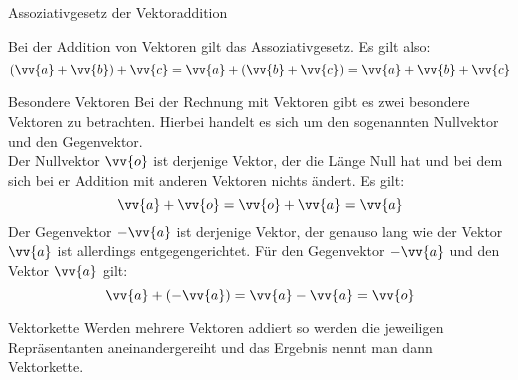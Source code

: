 \begin{satz}{Assoziativgesetz der Vektoraddition}{}\label{assivekadd}
\begin{center}
 Bei der Addition von Vektoren gilt das Assoziativgesetz. Es gilt also:
 $$(\vv{a} + \vv{b}) + \vv{c} = \vv{a} + (\vv{b} + \vv{c}) = \vv{a} + \vv{b} +\vv{c}$$
\end{center}
\end{satz}
\begin{b8d}{Besondere Vektoren}{}
Bei der Rechnung mit Vektoren gibt es zwei besondere Vektoren zu betrachten. Hierbei handelt es sich um den sogenannten Nullvektor und den Gegenvektor.\\
Der Nullvektor $\vv{o}$ ist derjenige Vektor, der die Länge Null hat und bei dem sich bei er Addition mit anderen Vektoren nichts ändert. Es gilt: $$\vv{a} +\vv{o} = \vv{o} +\vv{a} = \vv{a}$$
Der Gegenvektor $-\vv{a}$ ist derjenige Vektor, der genauso lang wie der Vektor $\vv{a}$ ist allerdings entgegengerichtet. Für den Gegenvektor $-\vv{a}$ und den Vektor $\vv{a}$ gilt: $$\vv{a} +( -\vv{a} ) =\vv{a}-\vv{a}= \vv{o}$$
\end{b8d}
\begin{bem}{Vektorkette}{}
Werden mehrere Vektoren addiert so werden die jeweiligen Repräsentanten aneinandergereiht und das Ergebnis nennt man dann Vektorkette.
\end{bem}
